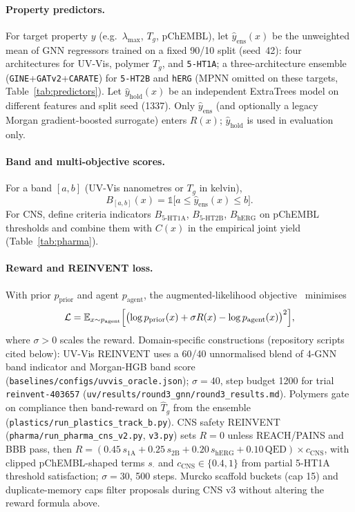 \documentclass[12pt]{article}
\begin{document}
\paragraph{Property predictors.} For target property $y$ (e.g.\ $\lambda_{\max}$, $T_g$, pChEMBL),
let $\hat{y}_{\mathrm{ens}}(x)$ be the unweighted mean of GNN regressors trained on a fixed
90/10 split (seed~42): four architectures for UV-Vis, polymer $T_g$, and \texttt{5-HT1A}; a
three-architecture ensemble (\texttt{GINE}+\texttt{GATv2}+\texttt{CARATE}) for \texttt{5-HT2B} and
\texttt{hERG} (MPNN omitted on these targets, Table~\ref{tab:predictors}). Let
$\hat{y}_{\mathrm{hold}}(x)$ be an independent ExtraTrees model on different features and split
seed (1337). Only $\hat{y}_{\mathrm{ens}}$ (and optionally a legacy Morgan gradient-boosted
surrogate) enters $R(x)$; $\hat{y}_{\mathrm{hold}}$ is used in evaluation only.

\paragraph{Band and multi-objective scores.} For a band $[a,b]$ (UV-Vis nanometres or $T_g$ in kelvin),
\begin{equation}
B_{[a,b]}(x)=\mathbb{1}\bigl[a\le \hat{y}_{\mathrm{ens}}(x)\le b\bigr].
\end{equation}
For CNS, define criteria indicators $B_{5\text{-HT1A}}$, $B_{5\text{-HT2B}}$, $B_{\mathrm{hERG}}$
on pChEMBL thresholds and combine them with $C(x)$ in the empirical joint yield
(Table~\ref{tab:pharma}).

\paragraph{Reward and REINVENT loss.} With prior $p_{\mathrm{prior}}$ and agent $p_{\mathrm{agent}}$,
the augmented-likelihood objective~\cite{blaschke2020reinvent} minimises
\begin{equation}
\mathcal{L}=\mathbb{E}_{x\sim p_{\mathrm{agent}}}
\Bigl[\bigl(\log p_{\mathrm{prior}}(x) + \sigma R(x) - \log p_{\mathrm{agent}}(x)\bigr)^2\Bigr],
\end{equation}
where $\sigma>0$ scales the reward. Domain-specific constructions (repository scripts cited below):
UV-Vis REINVENT uses a 60/40 unnormalised blend of 4-GNN band indicator and Morgan-HGB band score
(\texttt{baselines/configs/uvvis\_oracle.json}); $\sigma=40$, step budget 1200 for trial
\texttt{reinvent-403657} (\texttt{uv/results/round3\_gnn/round3\_results.md}). Polymers gate on
compliance then band-reward on $\hat{T}_g$ from the ensemble (\texttt{plastics/run\_plastics\_track\_b.py}).
CNS safety REINVENT (\texttt{pharma/run\_pharma\_cns\_v2.py}, \texttt{v3.py}) sets $R=0$ unless
REACH/PAINS and BBB pass, then $R=(0.45\,s_{\mathrm{1A}}+0.25\,s_{2\mathrm{B}}+0.20\,s_{\mathrm{hERG}}+0.10\,\mathrm{QED})\times c_{\mathrm{CNS}}$,
with clipped pChEMBL-shaped terms $s_{\cdot}$ and $c_{\mathrm{CNS}}\in\{0.4,1\}$ from partial 5-HT1A
threshold satisfaction; $\sigma=30$, 500 steps. Murcko scaffold buckets (cap 15) and duplicate-memory
caps filter proposals during CNS v3 without altering the reward formula above.
\end{document}
